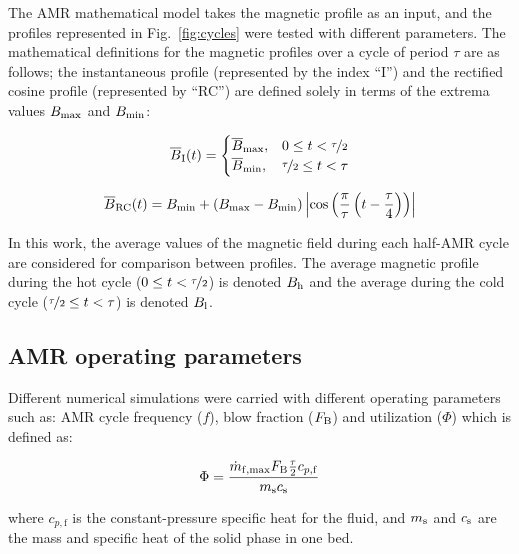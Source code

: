 \documentclass[draft]{svjour3}
\newcommand{\bmax}{\ensuremath{{B}\ped{max}}}
\newcommand{\bmin}{\ensuremath{{B}\ped{min}}}
\begin{document}
The AMR mathematical model takes the magnetic profile as an input, and the profiles represented in Fig.~\ref{fig:cycles} were tested with different parameters. The mathematical definitions for the magnetic profiles over a cycle of period $\tau$ are as follows; the instantaneous profile (represented by the index ``I'') and the rectified cosine profile (represented by ``RC'') are defined solely in terms of the extrema values $\bmax$ and $\bmin$:

\begin{equation}
\overline{B}_{\mathrm{I}}(t)=
\begin{cases}
\overline{B}_{\mathrm{max}}, & 0 \le t < \nicefrac{\tau}{2} \\
\overline{B}_{\mathrm{min}}, & \nicefrac{\tau}{2} \le t < \tau\\
\end{cases}
\label{eq:4}
\end{equation}

\begin{equation}
\average{B}\ped{RC}(t) = \bmin + \left(\bmax - \bmin\right)  \left\lvert \cos\left( \frac{\pi}{\tau} \left( t - \frac{\tau}{4}\right)\right) \right\rvert
\label{eq:5}
\end{equation}


In this work, the average values of the magnetic field during each half-AMR cycle are considered for comparison between profiles. The average magnetic profile during the hot cycle ($0 \le t < \nicefrac{\tau}{2}$) is denoted $B_{\mathrm{h}}$ and the average during the cold cycle  ($ \nicefrac{\tau}{2} \le t < \tau$) is denoted $B_{\mathrm{l}}$.

\subsection{AMR operating parameters}
\label{sec:amr-oper-param}


Different numerical simulations were carried with different operating parameters such as: AMR cycle frequency ($f$), blow fraction ($F_{\mathrm{B}}$) and utilization ($\Phi$) which is defined as:

\begin{equation}
\Phi = \frac{\dot{m}_{\mathrm{f,max}}F_{\mathrm{B}}\frac{\tau}{2}c_{p,\mathrm{f}}}{m_{\mathrm{s}} c_{\mathrm{s}}}
\label{eq:2}
\end{equation}

\noindent where $c_{p,\mathrm{f}}$ is the constant-pressure specific heat for the fluid, and $m_{\mathrm{s}}$ and $c_{\mathrm{s}}$ are the mass and specific heat of the solid phase in one bed. 
\end{document}
